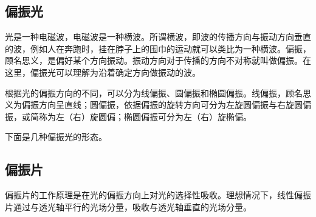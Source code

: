 
\begin{issues}
\issueDraft
\end{issues}


\subsection{偏振光}

光是一种电磁波，电磁波是一种横波。所谓横波，即波的传播方向与振动方向垂直的波，例如人在奔跑时，挂在脖子上的围巾的运动就可以类比为一种横波。偏振，顾名思义，是偏好某个方向振动。振动方向对于传播的方向不对称就叫做偏振。在这里，偏振光可以理解为沿着确定方向做振动的波。

根据光的偏振方向的不同，可以分为线偏振、圆偏振和椭圆偏振。线偏振，顾名思义为偏振方向呈直线；圆偏振，依据偏振的旋转方向可分为左旋圆偏振与右旋圆偏振，或简称为左（右）旋圆偏；椭圆偏振可分为左（右）旋椭偏。

下面是几种偏振光的形态。


\subsection{偏振片}
偏振片的工作原理是在光的偏振方向上对光的选择性吸收。理想情况下，线性偏振片通过与透光轴平行的光场分量，吸收与透光轴垂直的光场分量。

